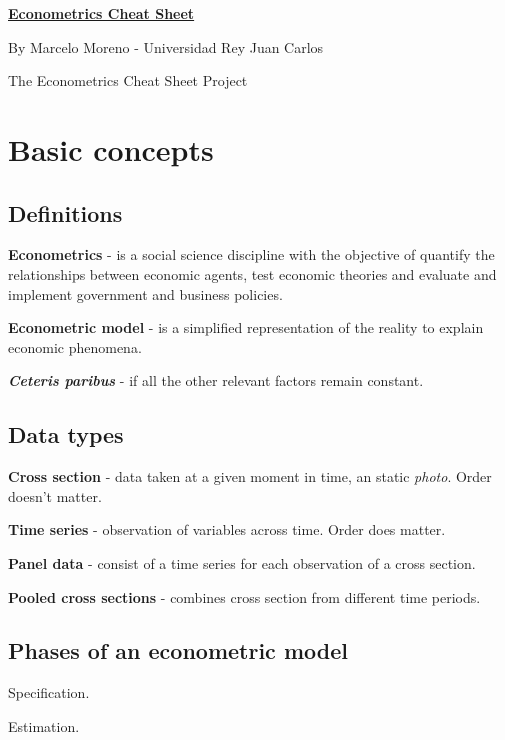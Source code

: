 \documentclass[10pt, a4paper, landscape]{article}
\begin{document}
	\begin{multicols}{3}
		\begin{center}
			\textbf{\LARGE \href{https://github.com/marcelomijas/econometrics-cheatsheet}{Econometrics Cheat Sheet}}
			
			{\footnotesize By Marcelo Moreno - Universidad Rey Juan Carlos}
			
			{\footnotesize The Econometrics Cheat Sheet Project}
		\end{center}
		
		\section*{Basic concepts}
		
		\subsection*{Definitions}
		
		\textbf{Econometrics} - is a social science discipline with the objective of quantify the relationships between economic agents, test economic theories and evaluate and implement government and business policies.
		
		\textbf{Econometric model} - is a simplified representation of the reality to explain economic phenomena.
		
		\textbf{\textsl{Ceteris paribus}} - if all the other relevant factors remain constant.
		
		\subsection*{Data types}
		
		\textbf{Cross section} - data taken at a given moment in time, an static \textsl{photo}. Order doesn't matter.
		
		\textbf{Time series} - observation of variables across time. Order does matter.
		
		\textbf{Panel data} - consist of a time series for each observation of a cross section.
		
		\textbf{Pooled cross sections} - combines cross section from different time periods.
		
		\subsection*{Phases of an econometric model}
		
		\begin{enumerate}[leftmargin=*]
			\setlength{\multicolsep}{0pt}
\end{enumerate}
\end{multicols}
\end{document}
